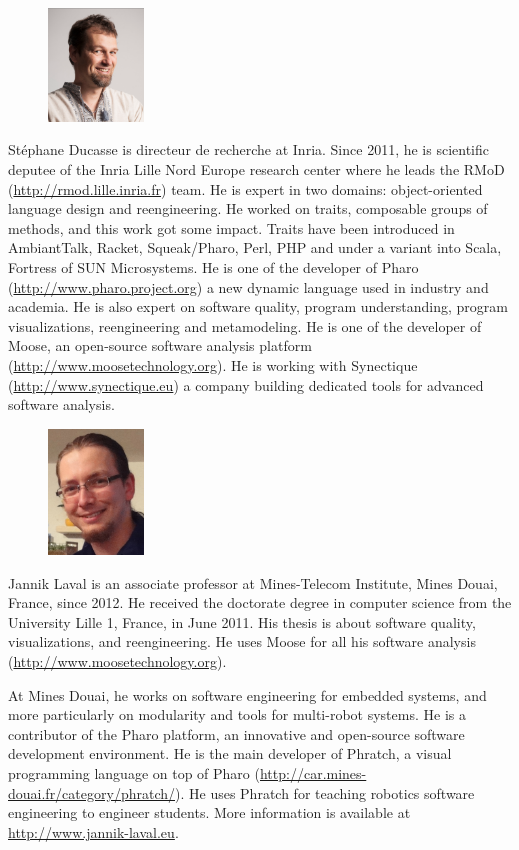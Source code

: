 \documentclass[a4paper,10pt,twoside]{book}
\begin{document}
\begin{figure}
\centering
\includegraphics[width=1in]{stephane}
\end{figure}
St\'ephane Ducasse is directeur de recherche at Inria. Since 2011, he is scientific deputee of the Inria Lille Nord Europe 
research center where he leads the RMoD (\url{http://rmod.lille.inria.fr}) team. He is expert in two domains: object-oriented language design and reengineering.  He worked on traits, composable groups of methods, and this work got some impact. Traits have been introduced in AmbiantTalk, Racket, Squeak/Pharo, Perl, PHP and  under a variant into Scala, Fortress of SUN Microsystems. He is one of the developer of Pharo (\url{http://www.pharo.project.org}) a new dynamic language used in industry and academia. He is also expert on software quality, program understanding, program visualizations, reengineering and metamodeling. He is one of the developer of Moose, an open-source software analysis platform (\url{http://www.moosetechnology.org}).  He is working with Synectique (\url{http://www.synectique.eu}) a company building dedicated tools for advanced software analysis.


\begin{figure}
\centering
\includegraphics[width=1in]{jannik}
\end{figure}
Jannik Laval is an associate professor at Mines-Telecom Institute, Mines Douai, France, since 2012. He received the doctorate degree in computer science from the University Lille 1, France, in June 2011. His thesis is about software quality, visualizations, and reengineering. He uses Moose for all his software analysis (\url{http://www.moosetechnology.org}).

At Mines Douai, he works on software engineering for embedded systems, and more particularly on modularity and tools for multi-robot systems. He is a contributor of the Pharo platform, an innovative and open-source software development environment. 
He is the main developer of Phratch, a visual programming language on top of Pharo (\url{http://car.mines-douai.fr/category/phratch/}). He uses  Phratch for teaching robotics software engineering to engineer students. 
More information is available at \url{http://www.jannik-laval.eu}.



\ifx\wholebook\relax\else
   
   
\end{document}
